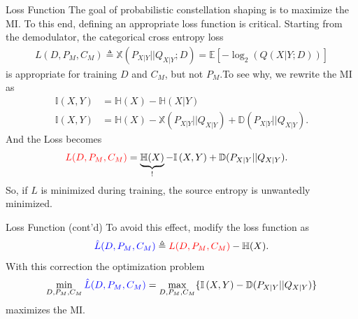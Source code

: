 \documentclass[english,aspectratio=1610,9pt,helvet,nicetitles]{ICEbeamerTUMCD}
\begin{document}
\begin{frame}{Loss Function}
	The goal of probabilistic constellation shaping is to maximize the MI. To this end, defining an appropriate loss function is critical. Starting from the demodulator, the categorical cross entropy loss
\begin{align*}
	L(D, P_M, C_M) \triangleq \mathbb{X}(P_{X|Y}||Q_{X|Y}; D) = \mathbb{E}\left[-\log_2(Q(X|Y;D))\right] 
\end{align*}
is appropriate for training $D$ and $C_M$, but not $P_M$.\pause To see why, we rewrite the MI as
\begin{align*}
	\mathbb{I} \left(X , Y\right) &= \mathbb{H}(X) - \mathbb{H}(X|Y)\\
	\mathbb{I} \left(X , Y\right) &= \mathbb{H}(X) - \mathbb{X}(P_{X|Y}||Q_{X|Y}) + \mathbb{D}(P_{X|Y}||Q_{X|Y}).
\end{align*}\pause
And the Loss becomes
\begin{align*}
\textcolor{red}{L(D, P_M, C_M)} &= \underbrace{\mathbb{H}(X)}_{!} -\mathbb{I} \left(X , Y\right) + \mathbb{D}(P_{X|Y}||Q_{X|Y}).
\end{align*}
So, if $L$ is minimized during training, the source entropy is unwantedly minimized.
\end{frame}

\begin{frame}{Loss Function (cont'd)}
To avoid this effect, \citeauthor{Stark} modify the loss function as
\begin{align*}
	\textcolor{blue}{\hat{L}(D, P_M, C_M)} \triangleq \textcolor{red}{L(D, P_M, C_M)} - \mathbb{H}(X).
\end{align*}
With this correction the optimization problem 
\begin{align*}
	\min_{D, P_M, C_M}\textcolor{blue}{\hat{L}(D, P_M, C_M)} = \max_{D, P_M, C_M} \{ \mathbb{I} \left(X , Y\right) - \mathbb{D}(P_{X|Y}||Q_{X|Y})\}
\end{align*}
maximizes the MI.
\end{frame}
\end{document}
